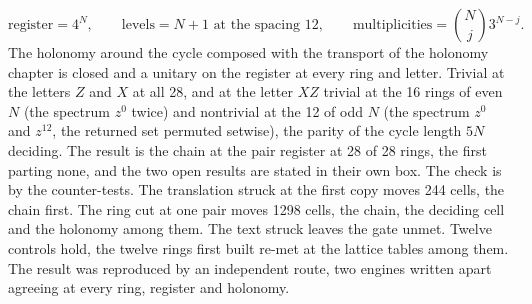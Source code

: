 \begin{chproof}
\begin{equation}
\text{register} = 4^{N}, \qquad \text{levels} = N + 1 \text{ at the spacing } 12, \qquad \text{multiplicities} = \binom{N}{j} 3^{N-j} .
\end{equation}
The holonomy around the cycle composed with the transport of the holonomy chapter is closed and a unitary on the register at every ring and letter. Trivial at the letters $Z$ and $X$ at all 28, and at the letter $XZ$ trivial at the 16 rings of even $N$ (the spectrum $z^{0}$ twice) and nontrivial at the 12 of odd $N$ (the spectrum $z^{0}$ and $z^{12}$, the returned set permuted setwise), the parity of the cycle length $5N$ deciding. The result is the chain at the pair register at 28 of 28 rings, the first parting none, and the two open results are stated in their own box.
The check is by the counter-tests. The translation struck at the first copy moves 244 cells, the chain first. The ring cut at one pair moves 1298 cells, the chain, the deciding cell and the holonomy among them. The text struck leaves the gate unmet. Twelve controls hold, the twelve rings first built re-met at the lattice tables among them.
The result was reproduced by an independent route, two engines written apart agreeing at every ring, register and holonomy.
\end{chproof}

\par\medskip{}\label{narr:close:12-3}\par
